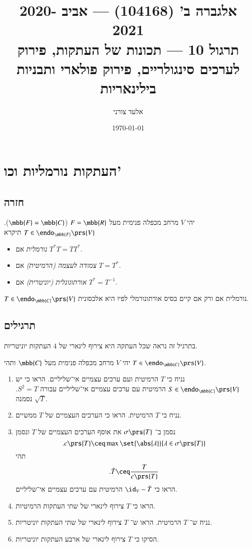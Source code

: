 \documentclass[a4paper,10pt,oneside,openany]{article}
\title{
אלגברה ב' (104168) \textenglish{---} אביב 2020-2021
\\
תרגול 10 \textenglish{---}
תכונות של העתקות, פירוק לערכים סינגולריים,
פירוק פולארי ותבניות בילינאריות
}
\author{אלעד צורני}
\date{\today}
\begin{document}
\maketitle

\section{העתקות נורמליות וכו'}

\subsection{חזרה}

\begin{definition}
יהי
$V$
מרחב מכפלה פנימית מעל
$F = \mbb{R}$
($\mbb{F} = \mbb{C}$).
$T \in \endo_{\mbb{F}}\prs{V}$
תיקרא
\begin{itemize}
\item \emph{נורמלית}
אם
$T^* T = T T^*$.
\item \emph{צמודה לעצמה (הרמיטית)}
אם
$T = T^*$.
\item \emph{אורתוגונלית (יוניטרית)}
אם
$T^* = T^{-1}$.
\end{itemize}
\end{definition}

\begin{theorem}
$T \in \endo_{\mbb{C}}\prs{V}$
נורמלית אם ורק אם קיים בסיס אורתונורמלי לפיו היא אלכסונית.
\end{theorem}

\subsection{תרגילים}

\begin{exercise}
בתרגיל זה נראה שכל העתקה היא צירוף לינארי של
$4$
העתקות יוניטריות.

יהי
$V$
מרחב מכפלה פנימית מעל
$\mbb{C}$
ותהי
$T \in \endo_{\mbb{C}}\prs{V}$.
\begin{enumerate}
\item נניח כי
$T$
הרמיטית ועם ערכים עצמיים אי־שליליים.
הראו כי יש
$S \in \endo_{\mbb{C}}\prs{V}$
הרמיטית עם ערכים עצמיים אי־שליליים עבורה
$S^2 = T$.
נסמנה
$\sqrt{T}$.

\item
נניח כי
$T$
הרמיטית. הראו כי הערכים העצמיים של
$T$
ממשיים.

\item נסמן ב־%
$\sigma\prs{T}$
את אוסף הערכים העצמיים של
$T$
ונסמן
\[\text{.} c \prs{T} \ceq \max\set{\abs{\lambda}}{\lambda \in \sigma\prs{T}}\]
תהי
\[\text{.} \tilde{T} \ceq \frac{T}{c\prs{T}}\]
הראו כי
$\id_V - \tilde{T}$
הרמיטית עם ערכים עצמיים אי־שליליים.

\item הראו כי
$T$
צירוף לינארי של שתי העתקות הרמיטיות.

\item 
נניח ש־%
$T$
הרמיטית.
הראו ש־%
$T$
צירוף לינארי של שתי העתקות יוניטריות.

\item
הסיקו כי
$T$
צירוף לינארי של ארבע העתקות יוניטריות.
\end{enumerate}
\end{exercise}
\end{document}
